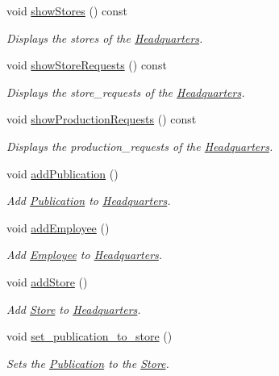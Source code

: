 \begin{DoxyCompactItemize}
void \hyperlink{class_headquarters_a5bd547ce60d0ebf56fa578686f88d207}{show\+Stores} () const
\begin{DoxyCompactList}\small\item\em Displays the stores of the \hyperlink{class_headquarters}{Headquarters}. \end{DoxyCompactList}\item 
void \hyperlink{class_headquarters_a57d34b620b22f134ffc64be46b830424}{show\+Store\+Requests} () const
\begin{DoxyCompactList}\small\item\em Displays the store\+\_\+requests of the \hyperlink{class_headquarters}{Headquarters}. \end{DoxyCompactList}\item 
void \hyperlink{class_headquarters_af1bdf66c16fe6b211fffe03a81a69ec2}{show\+Production\+Requests} () const
\begin{DoxyCompactList}\small\item\em Displays the production\+\_\+requests of the \hyperlink{class_headquarters}{Headquarters}. \end{DoxyCompactList}\item 
void \hyperlink{class_headquarters_ad232157623c9d2ada742982f08a82be8}{add\+Publication} ()
\begin{DoxyCompactList}\small\item\em Add \hyperlink{class_publication}{Publication} to \hyperlink{class_headquarters}{Headquarters}. \end{DoxyCompactList}\item 
void \hyperlink{class_headquarters_ac99ce9ba98b3bdddef13fedd5d2528f0}{add\+Employee} ()
\begin{DoxyCompactList}\small\item\em Add \hyperlink{class_employee}{Employee} to \hyperlink{class_headquarters}{Headquarters}. \end{DoxyCompactList}\item 
void \hyperlink{class_headquarters_ab0fa0fad9679f2f99811257d5a49f4c0}{add\+Store} ()
\begin{DoxyCompactList}\small\item\em Add \hyperlink{class_store}{Store} to \hyperlink{class_headquarters}{Headquarters}. \end{DoxyCompactList}\item 
void \hyperlink{class_headquarters_ae1b2bc854e26b7334169c0bece506646}{set\+\_\+publication\+\_\+to\+\_\+store} ()
\begin{DoxyCompactList}\small\item\em Sets the \hyperlink{class_publication}{Publication} to the \hyperlink{class_store}{Store}. \end{DoxyCompactList}\item 

\end{DoxyCompactItemize}
